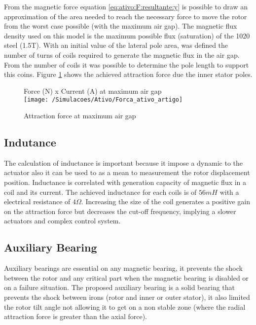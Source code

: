 \documentclass[10pt,fleqn,a4paper,twoside]{article}
\begin{document}
	From the magnetic force equation \eqref{eq:ativo:F:resultante:y} is possible to draw an approximation of the area needed to reach the necessary force to move the rotor from the worst case possible (with the maximum air gap). The magnetic flux density used on this model is the maximum possible flux (saturation) of the 1020 steel (1.5T). With an initial value of the lateral pole area, was defined the number of turns of coils required to generate the magnetic flux in the air gap. From the number of coils it was possible to determine the pole length to support this coins. Figure \ref{fig:magnetico:ativo:comsol} shows the achieved attraction force due the inner stator poles. 
	
	\begin{figure}
		\centering
		Force (N) x Current (A) at maximum air gap\\
		\texttt{[image: /Simulacoes/Ativo/Forca\_ativo\_artigo]}
		\caption{Attraction force at maximum air gap }
		\label{fig:magnetico:ativo:comsol}
	\end{figure}
	
	
	\subsection{Indutance} \label{subsec:at:indutancia}
	
	The calculation of inductance is important because it impose a dynamic to the actuator also it can be used to as a mean to measurement the rotor displacement position. Inductance is correlated with generation capacity of magnetic flux in a coil and its current. The achieved inductance for each coils is of $56 mH$ with a electrical resistance of $4 \Omega$. Increasing the size of the coil generates a positive gain on the attraction force but decreases the cut-off frequency, implying a slower actuators and complex control system.
	
	\subsection{Auxiliary Bearing}
	
	Auxiliary bearings are essential on any magnetic bearing, it prevents the shock between the rotor and any critical part when the magnetic bearing is disabled or on a failure situation. The proposed auxiliary bearing is a solid bearing that prevents the shock between irons (rotor and inner or outer stator), it also limited the rotor tilt angle not allowing it to get on a non stable zone (where the radial attraction force is greater than the axial force).
	
\end{document}
